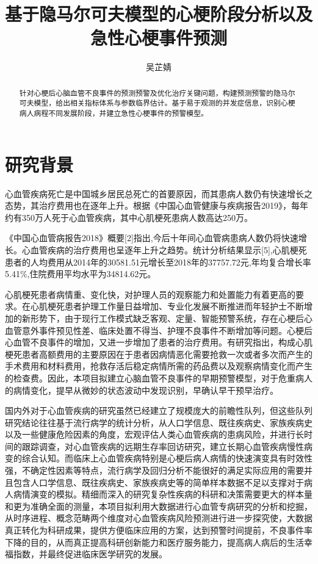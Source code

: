 \documentclass{article}
\title{基于隐马尔可夫模型的心梗阶段分析以及急性心梗事件预测}
\date{}
\author{
吴芷婧\quad \\
}
\begin{document}
\maketitle

\begin{abstract}
针对心梗后心脑血管不良事件的预测预警及优化治疗关键问题，构建预测预警的隐马尔可夫模型，给出相关指标体系与参数临界估计。基于易于观测的并发症信息，识别心梗病人病程不同发展阶段，并建立急性心梗事件的预警模型。
\end{abstract}
\section{研究背景}
心血管疾病死亡是中国城乡居民总死亡的首要原因，而其患病人数仍有快速增长之态势，其治疗费用也在逐年上升。根据《中国心血管健康与疾病报告2019》，每年约有350万人死于心血管疾病，其中心肌梗死患病人数高达250万。\par
《中国心血管病报告2018》概要[2]指出,今后十年间心血管病患病人数仍将快速增长。心血管疾病的治疗费用也呈逐年上升之趋势。统计分析结果显示[5],心肌梗死患者的人均费用从2014年的30581.51元增长至2018年的37757.72元,年均复合增长率5.41\%,住院费用平均水平为34814.62元。\par
心肌梗死患者病情重、变化快，对护理人员的观察能力和处置能力有着更高的要求。在心肌梗死患者护理工作量日益增加、专业化发展不断推进而年轻护士不断增加的新形势下，由于现行工作模式缺乏客观、定量、智能预警系统，存在心梗后心血管意外事件预见性差、临床处置不得当、护理不良事件不断增加等问题。心梗后心血管不良事件的增加，又进一步增加了患者的治疗费用。有研究指出，构成心肌梗死患者高额费用的主要原因在于患者因病情恶化需要抢救一次或者多次而产生的手术费用和材料费用，抢救存活后稳定病情所需的药品费以及观察病情变化而产生的检查费。因此，本项目拟建立心脑血管不良事件的早期预警模型，对于危重病人的病情变化，提早从微妙的状态波动中发现识别，早确认早干预早治疗。
\par
国内外对于心血管疾病的研究虽然已经建立了规模庞大的前瞻性队列，但这些队列研究结论往往基于流行病学的统计分析，从人口学信息、既往疾病史、家族疾病史以及一些健康危险因素的角度，宏观评估人类心血管疾病的患病风险，并进行长时间的跟踪调查，对心血管疾病的远期生存率回访研究，建立长期心血管疾病慢性病变的综合认知。而临床上心血管疾病特别是心梗后病人病情的快速演变具有时效性强，不确定性因素等特点，流行病学及回归分析不能很好的满足实际应用的需要并且包含人口学信息、既往疾病史、家族疾病史等的简单样本数据不足以支撑对于病人病情演变的模拟。精细而深入的研究复杂性疾病的科研和决策需要更大的样本量和更为准确全面的测量，本项目拟利用大数据进行心血管专病研究的分析和挖掘，从时序进程、概念范畴两个维度对心血管疾病风险预测进行进一步探究使，大数据真正转化为科研成果，提供方便临床应用的方案，达到预警时间提前，不良事件率下降的目的，从而真正提高科研创新能力和医疗服务能力，提高病人病后的生活幸福指数，并最终促进临床医学研究的发展。
\end{document}
